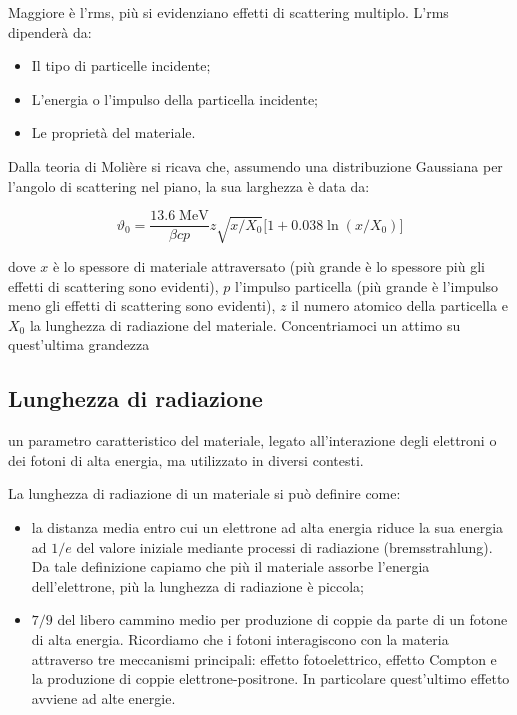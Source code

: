 Maggiore è l'rms, più si evidenziano effetti di scattering multiplo. L'rms dipenderà da:

\begin{itemize}
    \item Il tipo di particelle incidente;
    \item L'energia o l'impulso della particella incidente;
    \item Le proprietà del materiale.
\end{itemize}

Dalla teoria di Molière si ricava che, assumendo una distribuzione Gaussiana per l'angolo di scattering nel piano, la sua larghezza è data da:

$$\vartheta_0=\frac{13.6 \; \text{MeV}}{\beta c p} z \sqrt{x/X_0} \big[ 1 + 0.038 \ln(x/X_0) \big]$$

dove $x$ è lo spessore di materiale attraversato (più grande è lo spessore più gli effetti di scattering sono evidenti), $p$ l'impulso particella (più grande è l'impulso meno gli effetti di scattering sono evidenti), $z$ il numero atomico della particella e $X_0$ la lunghezza di radiazione del materiale. Concentriamoci un attimo su quest'ultima grandezza

\subsection{Lunghezza di radiazione}\label{par:lunghezza_di_radiazione}

\E un parametro caratteristico del materiale, legato all'interazione degli elettroni o dei fotoni di alta energia, ma utilizzato in diversi contesti.

La lunghezza di radiazione di un materiale si può definire come:

\begin{itemize}[leftmargin=0.5cm]
    \item la distanza media entro cui un elettrone ad alta energia riduce la sua energia ad $1/e$ del valore iniziale mediante processi di radiazione (bremsstrahlung). Da tale definizione capiamo che più il materiale assorbe l'energia dell'elettrone, più la lunghezza di radiazione è piccola;
    \item $7/9$ del libero cammino medio per produzione di coppie da parte di un fotone di alta energia. Ricordiamo che i fotoni interagiscono con la materia attraverso tre meccanismi principali: effetto fotoelettrico, effetto Compton e la produzione di coppie elettrone-positrone. In particolare quest'ultimo effetto avviene ad alte energie.
\end{itemize}

